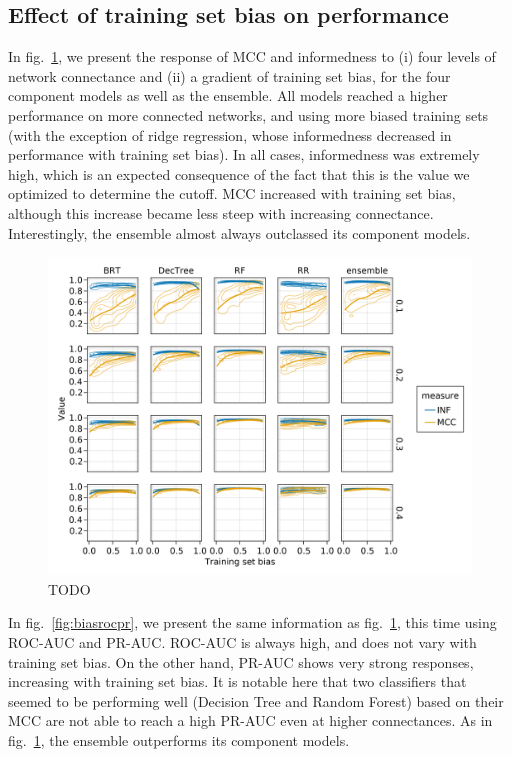 \documentclass[10pt,oneside]{article}
\makeatletter
\def\maxwidth{\ifdim\Gin@nat@width>\linewidth\linewidth
\else\Gin@nat@width\fi}
\let\Oldincludegraphics\includegraphics
\renewcommand{\includegraphics}[1]{\Oldincludegraphics[width=\maxwidth]{#1}}
\makeatother
\begin{document}
\hypertarget{effect-of-training-set-bias-on-performance}{%
\subsection{Effect of training set bias on
performance}\label{effect-of-training-set-bias-on-performance}}

In fig.~\ref{fig:biasmccinf}, we present the response of MCC and
informedness to (i) four levels of network connectance and (ii) a
gradient of training set bias, for the four component models as well as
the ensemble. All models reached a higher performance on more connected
networks, and using more biased training sets (with the exception of
ridge regression, whose informedness decreased in performance with
training set bias). In all cases, informedness was extremely high, which
is an expected consequence of the fact that this is the value we
optimized to determine the cutoff. MCC increased with training set bias,
although this increase became less steep with increasing connectance.
Interestingly, the ensemble almost always outclassed its component
models.

\begin{figure}
\hypertarget{fig:biasmccinf}{%
\centering
\includegraphics{figures/bias_mcc_inf.png}
\caption{TODO}\label{fig:biasmccinf}
}
\end{figure}

In fig.~\ref{fig:biasrocpr}, we present the same information as
fig.~\ref{fig:biasmccinf}, this time using ROC-AUC and PR-AUC. ROC-AUC
is always high, and does not vary with training set bias. On the other
hand, PR-AUC shows very strong responses, increasing with training set
bias. It is notable here that two classifiers that seemed to be
performing well (Decision Tree and Random Forest) based on their MCC are
not able to reach a high PR-AUC even at higher connectances. As in
fig.~\ref{fig:biasmccinf}, the ensemble outperforms its component
models.
\end{document}
